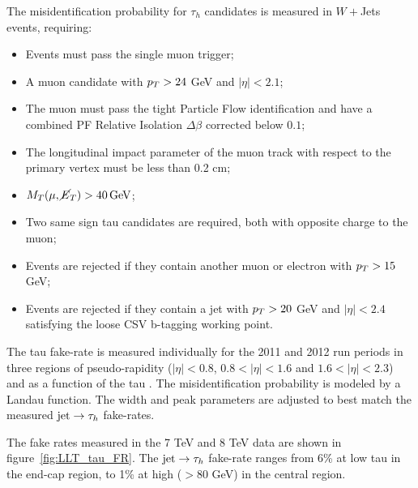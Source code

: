The misidentification probability for $\tau_h$ candidates is measured in $W+$Jets events, requiring:
\begin{itemize}
\item Events must pass the single muon trigger;
\item A muon candidate with $p_{T} > 24$ GeV and $|\eta| < 2.1$;
\item The muon must pass the tight Particle Flow identification and have a combined PF Relative Isolation $\Delta \beta $ corrected below $0.1$;
\item The longitudinal impact parameter of the muon track with respect to the primary vertex must be less than 0.2 cm;
\item $M_{T}(\mu, \cancel{E}_T) > 40\, \mathrm{GeV}$;
\item Two same sign tau candidates are required, both with opposite charge to the muon;
\item Events are rejected if they contain another muon or electron with $p_{T} > 15$ GeV;
\item Events are rejected if they contain a jet with $p_{T} > 20$ GeV and $|\eta|< 2.4$ satisfying the loose CSV b-tagging working point.
\end{itemize}
The tau fake-rate is measured individually for the 2011 and 2012 run periods in three regions of pseudo-rapidity ($|\eta|<0.8$,
\mbox{$0.8<|\eta|<1.6$} and $1.6<|\eta|<2.3$) and as a function of the tau \pT. The misidentification probability is modeled by a Landau function. %
The width and peak parameters are adjusted to best match the measured $\mathrm{jet}\rightarrow\tau_h$ fake-rates.

The fake rates measured in the %
7 TeV and 8 TeV data are shown in figure~\ref{fig:LLT_tau_FR}. The $\mathrm{jet}\rightarrow\tau_h$ fake-rate %
ranges from 6\% at low tau \pT in the end-cap region, to 1\% at high \pT ($ > 80$ GeV) in the central region.

